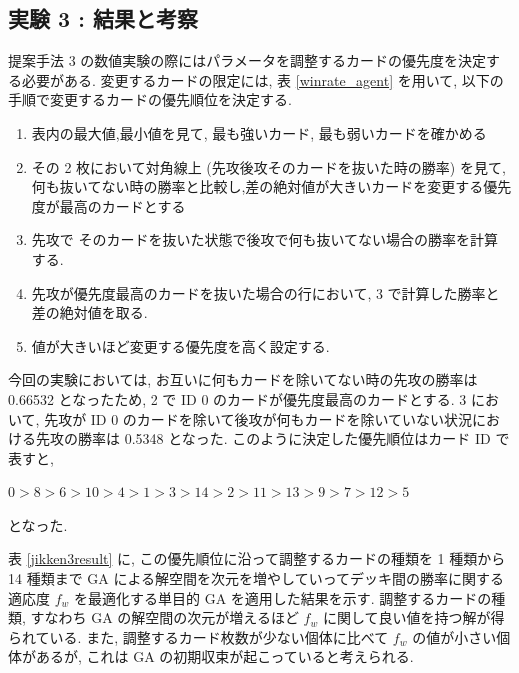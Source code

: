 \documentclass[12pt]{jarticle}
\begin{document}
\subsection{実験 3 : 結果と考察}
提案手法 3 の数値実験の際にはパラメータを調整するカードの優先度を決定する必要がある.
変更するカードの限定には, 表 \ref{winrate_agent} を用いて, 以下の手順で変更するカードの優先順位を決定する. 
\begin{enumerate}
  \item 表内の最大値,最小値を見て, 最も強いカード, 最も弱いカードを確かめる
  \item その 2 枚において対角線上 (先攻後攻そのカードを抜いた時の勝率) を見て, 何も抜いてない時の勝率と比較し,差の絶対値が大きいカードを変更する優先度が最高のカードとする
  \item 先攻で そのカードを抜いた状態で後攻で何も抜いてない場合の勝率を計算する.
  \item 先攻が優先度最高のカードを抜いた場合の行において, 3 で計算した勝率と差の絶対値を取る. 
  \item 値が大きいほど変更する優先度を高く設定する.
\end{enumerate}
今回の実験においては, お互いに何もカードを除いてない時の先攻の勝率は 0.66532 となったため,  2 で ID 0 のカードが優先度最高のカードとする. 3 において, 先攻が ID 0 のカードを除いて後攻が何もカードを除いていない状況における先攻の勝率は 0.5348 となった. 
このように決定した優先順位はカード ID で表すと, \par
$0 > 8 > 6 > 10 > 4 > 1 > 3 > 14 > 2 > 11 > 13 > 9 > 7 > 12 > 5$ \par
となった. \par
表 \ref{jikken3result} に, この優先順位に沿って調整するカードの種類を 1 種類から 14 種類まで GA による解空間を次元を増やしていってデッキ間の勝率に関する適応度 $f_w$ を最適化する単目的 GA を適用した結果を示す.
調整するカードの種類, すなわち GA の解空間の次元が増えるほど $f_w$ に関して良い値を持つ解が得られている. また, 調整するカード枚数が少ない個体に比べて $f_w$ の値が小さい個体があるが, これは GA の初期収束が起こっていると考えられる.  \par
\end{document}
